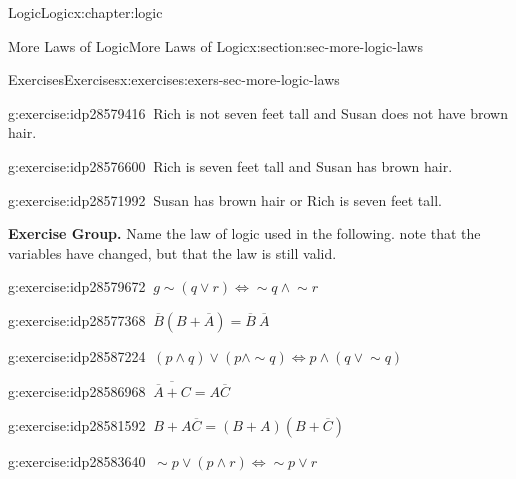 \documentclass[twoside,10pt,]{book}
\numberwithin{equation}{section}
\begin{document}
\begin{chapterptx}{Logic}{}{Logic}{}{}{x:chapter:logic}
\begin{sectionptx}{More Laws of Logic}{}{More Laws of Logic}{}{}{x:section:sec-more-logic-laws}
\begin{exercises-subsection}{Exercises}{}{Exercises}{}{}{x:exercises:exers-sec-more-logic-laws}
\begin{exercisegroup}
\begin{divisionexerciseeg}{6}{}{}{g:exercise:idp28579416}%
\(\ \)Rich is not seven feet tall and Susan does not have brown hair.\end{divisionexerciseeg}%
\begin{divisionexerciseeg}{7}{}{}{g:exercise:idp28576600}%
\(\ \)Rich is seven feet tall and Susan has brown hair.\end{divisionexerciseeg}%
\begin{divisionexerciseeg}{8}{}{}{g:exercise:idp28571992}%
\(\ \)Susan has brown hair or Rich is seven feet tall.\end{divisionexerciseeg}%
\end{exercisegroup}
\par\medskip\noindent
\par\medskip\noindent%
\textbf{Exercise Group.}\space\space%
Name the law of logic used in the following.  note that the variables have changed, but that the law is still valid.\begin{exercisegroup}
\begin{divisionexerciseeg}{9}{}{}{g:exercise:idp28579672}%
\(\ g\sim\!{(q {\vee}{} r)} {\Leftrightarrow} \sim\!{q}{} {\wedge}{} \sim\!{r}{}\)\end{divisionexerciseeg}%
\begin{divisionexerciseeg}{10}{}{}{g:exercise:idp28577368}%
\(\ \overline{B}{} (B + \overline{A}{}) = \overline{B}{}~\overline{A}{} \)\end{divisionexerciseeg}%
\begin{divisionexerciseeg}{11}{}{}{g:exercise:idp28587224}%
\(\ (p {\wedge}{} q) {\vee}{} (p {\wedge} \sim\!{q}{}) {\Leftrightarrow}{} p {\wedge}{} (q {\vee}{}\sim\!{q}{})\)\end{divisionexerciseeg}%
\begin{divisionexerciseeg}{12}{}{}{g:exercise:idp28586968}%
\(\ \overline{\overline{A}{} + C} = A\overline{C}{}\)\end{divisionexerciseeg}%
\begin{divisionexerciseeg}{13}{}{}{g:exercise:idp28581592}%
\(\ B + A\overline{C}{} =(B+A)(B+\overline{C}{})\)\end{divisionexerciseeg}%
\begin{divisionexerciseeg}{14}{}{}{g:exercise:idp28583640}%
\(\ \sim\!{p}{} {\vee}{} (p {\wedge}{} r) {\Leftrightarrow}{} \sim\!{p}{}{\vee}{}r\)\end{divisionexerciseeg}%
\end{exercisegroup}
\par\medskip\noindent

\end{exercises-subsection}
\end{sectionptx}
\end{chapterptx}
\end{document}
